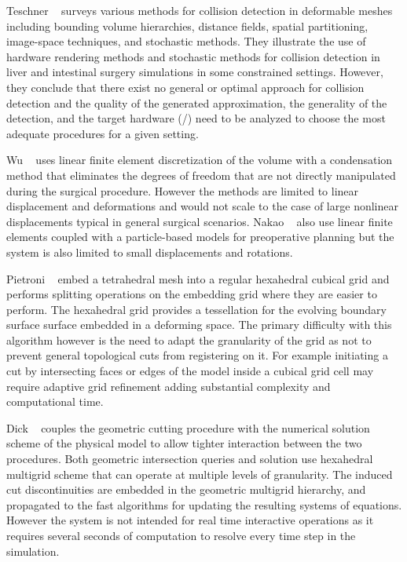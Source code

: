 Teschner \etal~\cite{teschner:cgf:2005} surveys various methods for collision detection in deformable meshes including
bounding volume hierarchies, distance fields, spatial partitioning, image-space techniques, and
stochastic methods. They illustrate the use of hardware rendering methods and stochastic methods for collision detection in liver and intestinal surgery simulations in some constrained settings. However, they conclude that there exist no general or optimal approach for collision detection and the quality of the generated approximation, the generality of the detection, and the target hardware (/) need to be analyzed to choose the most adequate procedures for a given setting.

Wu \etal~\cite{wu:tvc:2005} uses linear finite element discretization of the  volume with a condensation method that eliminates the degrees of freedom that are not directly manipulated during the surgical procedure. However the methods are limited to linear displacement and deformations and would not scale to the case of large nonlinear displacements typical in general surgical scenarios. Nakao \etal~\cite{nakao:jms:2006} also use linear finite elements coupled with a particle-based models for preoperative planning but the system is also limited to small displacements and rotations.

Pietroni \etal~\cite{pietroni:tvc:2009} embed a  tetrahedral mesh into a regular hexahedral cubical grid and performs splitting operations on the embedding grid where they are easier to perform. The hexahedral grid provides a tessellation for the evolving boundary surface surface embedded in a deforming space. The primary difficulty with this algorithm however is the need to adapt the granularity of the grid as not to prevent general topological cuts from registering on it. For example initiating a cut by intersecting faces or edges of the model inside a cubical grid cell may require adaptive grid refinement adding substantial complexity and computational time.

Dick \etal~\cite{dick:tvcg:2011} couples the geometric cutting procedure with the numerical solution scheme of the physical model to allow tighter interaction between the two procedures. Both geometric intersection queries and solution use hexahedral multigrid scheme that can operate at multiple levels of granularity. The induced cut discontinuities are embedded in the geometric multigrid hierarchy, and propagated to the fast algorithms for updating the resulting systems of equations. However the system is not intended for real time interactive operations as it requires several seconds of computation to resolve every time step in the simulation.


